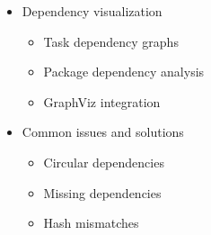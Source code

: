 \documentclass[
]{article}
\providecommand{\tightlist}{%
  \setlength{\itemsep}{0pt}\setlength{\parskip}{0pt}}
\begin{document}
\begin{itemize}
\begin{itemize}
\begin{itemize}
      \begin{itemize}
      \tightlist
      \item
        Layer inspection and manipulation
      \item
        Recipe search and analysis
      \end{itemize}
    \item
      Dependency visualization

      \begin{itemize}
      \tightlist
      \item
        Task dependency graphs
      \item
        Package dependency analysis
      \item
        GraphViz integration
      \end{itemize}
    \item
      Common issues and solutions

      \begin{itemize}
      \tightlist
      \item
        Circular dependencies
      \item
        Missing dependencies
      \item
        Hash mismatches
      \end{itemize}
    \end{itemize}
  \end{itemize}
\end{itemize}
\end{document}
